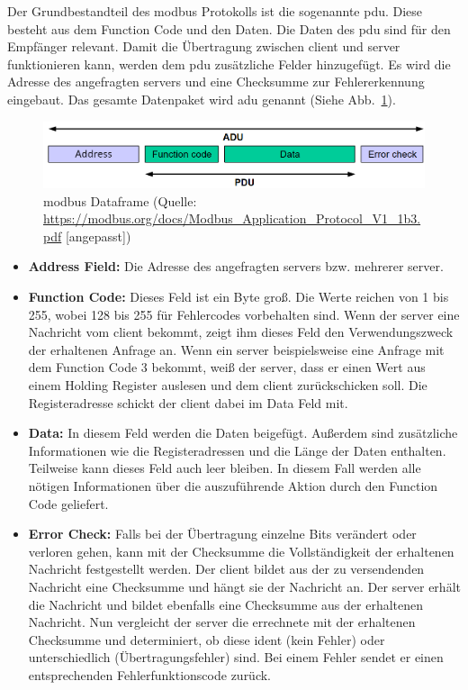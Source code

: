 Der Grundbestandteil des \gls{modbus} Protokolls ist die sogenannte \acf{pdu}. Diese besteht aus dem Function Code und den Daten. Die Daten des \acs{pdu} sind für den Empfänger relevant. Damit die Übertragung zwischen \gls{client} und \gls{server} funktionieren kann, werden dem \acs{pdu} zusätzliche Felder hinzugefügt. Es wird die Adresse des angefragten \gls{server}s und eine Checksumme zur Fehlererkennung eingebaut. Das gesamte Datenpaket wird \acf{adu} genannt (Siehe Abb.~\ref{fig:modbus_adu_pdu}).
\begin{figure}[H]
	\centering
	\includegraphics[width=1.0\linewidth]{Bilder/General_Modbus_Frame_Changed}
	\caption{\gls{modbus} Dataframe (Quelle: \url{https://modbus.org/docs/Modbus_Application_Protocol_V1_1b3.pdf} [angepasst])}
	\label{fig:modbus_adu_pdu}
\end{figure}

\begin{itemize}
	\item \textbf{Address Field:} Die Adresse des angefragten \gls{server}s bzw. mehrerer \gls{server}. 
	\item \textbf{Function Code:} Dieses Feld ist ein Byte groß. Die Werte reichen von 1 bis 255, wobei 128 bis 255 für Fehlercodes vorbehalten sind. Wenn der \gls{server} eine Nachricht vom \gls{client} bekommt, zeigt ihm dieses Feld den Verwendungszweck der erhaltenen Anfrage an. Wenn ein \gls{server} beispielsweise eine Anfrage mit dem Function Code 3 bekommt, weiß der \gls{server}, dass er einen Wert aus einem Holding Register auslesen und dem \gls{client} zurückschicken soll. Die Registeradresse schickt der \gls{client} dabei im Data Feld mit.
	\item \textbf{Data:} In diesem Feld werden die Daten beigefügt. Außerdem sind zusätzliche Informationen wie die Registeradressen und die Länge der Daten enthalten. Teilweise kann dieses Feld auch leer bleiben. In diesem Fall werden alle nötigen Informationen über die auszuführende Aktion durch den Function Code geliefert. 
	\item \textbf{Error Check:} Falls bei der Übertragung einzelne Bits verändert oder verloren gehen, kann mit der Checksumme die Vollständigkeit der erhaltenen Nachricht festgestellt werden. Der \gls{client} bildet aus der zu versendenden Nachricht eine Checksumme und hängt sie der Nachricht an. Der \gls{server} erhält die Nachricht und bildet ebenfalls eine Checksumme aus der erhaltenen Nachricht. Nun vergleicht der \gls{server} die errechnete mit der erhaltenen Checksumme und determiniert, ob diese ident (kein Fehler) oder unterschiedlich (Übertragungsfehler) sind. Bei einem Fehler sendet er einen entsprechenden Fehlerfunktionscode zurück.
\end{itemize}

